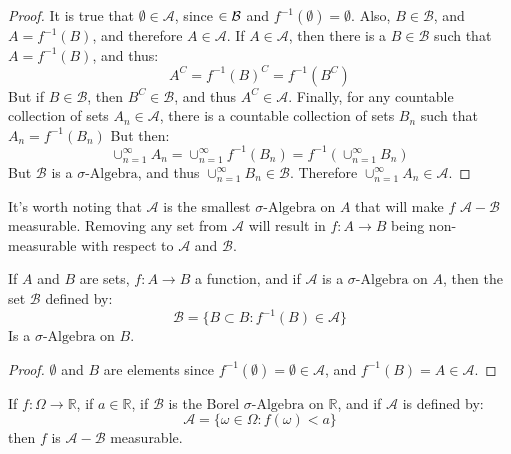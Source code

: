         \begin{proof}
            It is true that $\emptyset\in\mathcal{A}$, since
            $\empty\in\mathcal{B}$ and $f^{-1}(\emptyset)=\emptyset$. Also,
            $B\in\mathcal{B}$, and $A=f^{-1}(B)$, and therefore
            $A\in\mathcal{A}$. If $A\in\mathcal{A}$, then there is a
            $B\in\mathcal{B}$ such that $A=f^{-1}(B)$, and thus:
            \begin{equation}
                A^{C}=f^{-1}(B)^{C}=f^{-1}(B^{C})
            \end{equation}
            But if $B\in\mathcal{B}$, then $B^{C}\in\mathcal{B}$, and thus
            $A^{C}\in\mathcal{A}$. Finally, for any countable collection of
            sets $A_{n}\in\mathcal{A}$, there is a countable collection of sets
            $B_{n}$ such that $A_{n}=f^{-1}(B_{n})$ But then:
            \begin{equation}
                \cup_{n=1}^{\infty}A_{n}=\cup_{n=1}^{\infty}f^{-1}(B_{n})
                    =f^{-1}(\cup_{n=1}^{\infty}B_{n})
            \end{equation}
            But $\mathcal{B}$ is a $\sigma\text{-Algebra}$, and thus
            $\cup_{n=1}^{\infty}B_{n}\in\mathcal{B}$. Therefore
            $\cup_{n=1}^{\infty}A_{n}\in\mathcal{A}$.
        \end{proof}
        It's worth noting that $\mathcal{A}$ is the smallest
        $\sigma\text{-Algebra}$ on $A$ that will make
        $f$ $\mathcal{A}-\mathcal{B}$ measurable. Removing any set from
        $\mathcal{A}$ will result in $f:A\rightarrow{B}$ being non-measurable
        with respect to $\mathcal{A}$ and $\mathcal{B}$.
        \begin{theorem}
            If $A$ and $B$ are sets, $f:A\rightarrow{B}$ a function, and if
            $\mathcal{A}$ is a $\sigma\text{-Algebra}$ on $A$, then the set
            $\mathcal{B}$ defined by:
            \begin{equation}
                \mathcal{B}=\{B\subset{B}:f^{-1}(B)\in\mathcal{A}\}
            \end{equation}
            Is a $\sigma\text{-Algebra}$ on $B$.
        \end{theorem}
        \begin{proof}
            $\emptyset$ and $B$ are elements since
            $f^{-1}(\emptyset)=\emptyset\in\mathcal{A}$, and
            $f^{-1}(B)=A\in\mathcal{A}$.
        \end{proof}
        \begin{theorem}
            If $f:\Omega\rightarrow\mathbb{R}$, if $a\in\mathbb{R}$, if
            $\mathcal{B}$ is the Borel $\sigma\text{-Algebra}$ on $\mathbb{R}$,
            and if $\mathcal{A}$ is defined by:
            \begin{equation}
                \mathcal{A}=\{\omega\in\Omega:f(\omega)<a\}
            \end{equation}
            then $f$ is $\mathcal{A}-\mathcal{B}$ measurable.
        \end{theorem}

